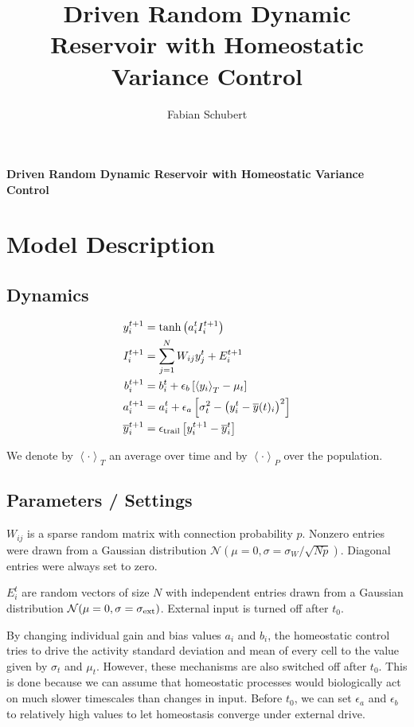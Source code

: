 \documentclass[10pt,a4paper]{article}
\author{Fabian Schubert}
\title{Driven Random Dynamic Reservoir with Homeostatic Variance Control}
\newcommand{\avgt}[1]{\left< #1 \right>_T}
\newcommand{\avgp}[1]{\left< #1 \right>_P}
\begin{document}
\begin{center}
\begin{LARGE}
\textbf{Driven Random Dynamic Reservoir with Homeostatic Variance Control}\\
\end{LARGE}
\end{center}

\section{Model Description}

\subsection{Dynamics}
\begin{align}
y_i^{t+1} &= \mathrm{tanh}\left( a_i^t I_i^{t+1} \right) \label{eq:reserv_dynamics}\\
I_i^{t+1} &= \sum_{j=1}^{N} W_{ij} y_j^t + E_i^{t+1} \label{eq:input_dynamics} \\
b_i^{t+1} &= b_i^t + \epsilon_{b} \left[ \avgt{y_i} - \mu_{t} \right] \\
a_i^{t+1} &= a_i^{t} + \epsilon_{a} \left[ \sigma_{t}^2 - \left( y_i^t - \overline{y}(t)_i\right)^2 \right] \label{eq:gain_dynamcis} \\
\overline{y}^{t+1}_i &= \epsilon_{\rm trail} \left[ y_i^{t+1} - \overline{y}^{t}_i\right]
\end{align}

We denote by $\avgt{\cdot}$ an average over time and by $\avgp{\cdot}$ over the population.

\subsection{Parameters / Settings}

$W_{ij}$ is a sparse random matrix with connection probability $p$. Nonzero entries were drawn from a Gaussian distribution $\mathcal{N}(\mu = 0,\sigma = \sigma_{W} / \sqrt{N p})$. Diagonal entries were always set to zero.

$E^t_{i}$ are random vectors of size $N$ with independent entries drawn from a Gaussian distribution $\mathcal{N}(\mu = 0,\sigma = \sigma_{\rm ext})$. External input is turned off after $t_0$.

By changing individual gain and bias values $a_i$ and $b_i$, the homeostatic control tries to drive the activity standard deviation and mean of every cell to the value given by $\sigma_{t}$ and $\mu_{t}$. However, these mechanisms are also switched off after $t_0$. This is done because we can assume that homeostatic processes would biologically act on much slower timescales than changes in input. Before $t_0$, we can set $\epsilon_{a}$ and $\epsilon_{b}$ to relatively high values to let homeostasis converge under external drive.
\end{document}

